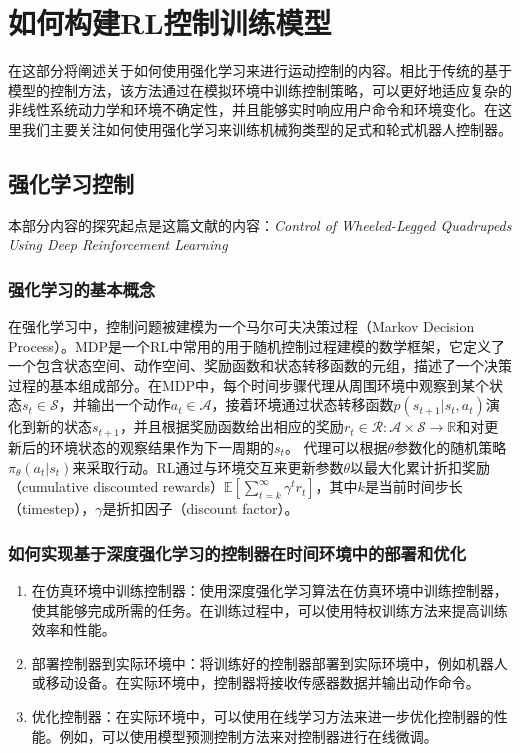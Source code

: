 
\chapter{如何构建RL控制训练模型}
在这部分将阐述关于如何使用强化学习来进行运动控制的内容。相比于传统的基于模型的控制方法，该方法通过在模拟环境中训练控制策略，可以更好地适应复杂的非线性系统动力学和环境不确定性，并且能够实时响应用户命令和环境变化。在这里我们主要关注如何使用强化学习来训练机械狗类型的足式和轮式机器人控制器。


\section{强化学习控制}

本部分内容的探究起点是这篇文献的内容：\emph{Control of Wheeled-Legged Quadrupeds Using Deep Reinforcement Learning}\cite{Lee_Bjelonic_Hutter_2023}


\subsection{强化学习的基本概念}

在强化学习中，控制问题被建模为一个马尔可夫决策过程（Markov Decision Process）。MDP是一个RL中常用的用于随机控制过程建模的数学框架，它定义了一个包含状态空间、动作空间、奖励函数和状态转移函数的元组，描述了一个决策过程的基本组成部分。在MDP中，每个时间步骤代理从周围环境中观察到某个状态$s_t \in \mathcal{S}$，并输出一个动作$a_t \in \mathcal{A}$，接着环境通过状态转移函数$p(s_{t+1}|s_t, a_t)$演化到新的状态$s_{t+1}$，并且根据奖励函数给出相应的奖励$r_t\in \mathcal{R}:\mathcal{A}\times\mathcal{S}\to \mathbb{R}$和对更新后的环境状态的观察结果作为下一周期的$s_t$。
代理可以根据$\theta$参数化的随机策略$\pi_\theta(a_t|s_t)$来采取行动。RL通过与环境交互来更新参数$\theta$以最大化累计折扣奖励（cumulative discounted rewards）$\mathbb{E} [\sum_{t=k}^{\infty}\gamma^t r_t]$，其中$k$是当前时间步长（timestep），$\gamma$是折扣因子（discount factor）。

\subsection{如何实现基于深度强化学习的控制器在时间环境中的部署和优化}

\begin{enumerate}
    \item 在仿真环境中训练控制器：使用深度强化学习算法在仿真环境中训练控制器，使其能够完成所需的任务。在训练过程中，可以使用特权训练方法来提高训练效率和性能。
    \item 部署控制器到实际环境中：将训练好的控制器部署到实际环境中，例如机器人或移动设备。在实际环境中，控制器将接收传感器数据并输出动作命令。
    \item 优化控制器：在实际环境中，可以使用在线学习方法来进一步优化控制器的性能。例如，可以使用模型预测控制方法来对控制器进行在线微调。
\end{enumerate}

